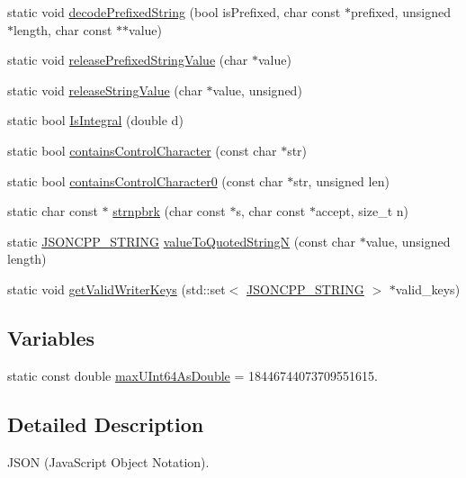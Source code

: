 \begin{DoxyCompactItemize}
static void \hyperlink{namespace_json_aad8b4982c1acd164f541fba396ac9fb1}{decode\+Prefixed\+String} (bool is\+Prefixed, char const $\ast$prefixed, unsigned $\ast$length, char const $\ast$$\ast$value)
\item 
static void \hyperlink{namespace_json_a48f4e3ea655e3b4a5d7f892c81f00511}{release\+Prefixed\+String\+Value} (char $\ast$value)
\item 
static void \hyperlink{namespace_json_a3e0d81d514d0e8bddf33b08074214abd}{release\+String\+Value} (char $\ast$value, unsigned)
\item 
static bool \hyperlink{namespace_json_a1a04cc9d31e64b5912dade003c9b99b5}{Is\+Integral} (double d)
\item 
static bool \hyperlink{namespace_json_aa11b210ff98a4f4dd4e2df19260f8c3a}{contains\+Control\+Character} (const char $\ast$str)
\item 
static bool \hyperlink{namespace_json_ae8a357381f264cf28f46449e79ab1dea}{contains\+Control\+Character0} (const char $\ast$str, unsigned len)
\item 
static char const  $\ast$ \hyperlink{namespace_json_a7492156d0c7d2dd2f672acacfb240320}{strnpbrk} (char const $\ast$s, char const $\ast$accept, size\+\_\+t n)
\item 
static \hyperlink{json_8h_a1e723f95759de062585bc4a8fd3fa4be}{J\+S\+O\+N\+C\+P\+P\+\_\+\+S\+T\+R\+I\+NG} \hyperlink{namespace_json_a29aff81733b8fdaabf3f1acfc3ad339f}{value\+To\+Quoted\+StringN} (const char $\ast$value, unsigned length)
\item 
static void \hyperlink{namespace_json_a77ffcc6bb405332d84c260d304d4384e}{get\+Valid\+Writer\+Keys} (std\+::set$<$ \hyperlink{json_8h_a1e723f95759de062585bc4a8fd3fa4be}{J\+S\+O\+N\+C\+P\+P\+\_\+\+S\+T\+R\+I\+NG} $>$ $\ast$valid\+\_\+keys)
\end{DoxyCompactItemize}
\subsection*{Variables}
\begin{DoxyCompactItemize}
\item 
static const double \hyperlink{namespace_json_aecc0306aa526f25c5156f842182fb7fb}{max\+U\+Int64\+As\+Double} = 18446744073709551615.
\end{DoxyCompactItemize}


\subsection{Detailed Description}
J\+S\+ON (Java\+Script Object Notation). 

